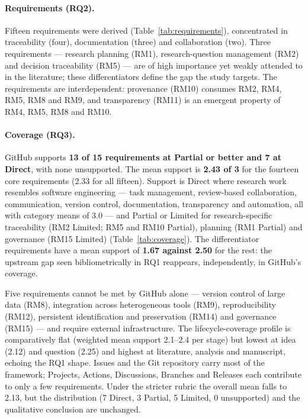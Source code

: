 \documentclass[pdflatex,sn-mathphys-num]{sn-jnl}%
\begin{document}
\paragraph{Requirements (RQ2).} Fifteen requirements were derived (Table~\ref{tab:requirements}), concentrated in traceability (four), documentation (three) and collaboration (two). Three requirements --- research planning (RM1), research-question management (RM2) and decision traceability (RM5) --- are of high importance yet weakly attended to in the literature; these differentiators define the gap the study targets. The requirements are interdependent: provenance (RM10) consumes RM2, RM4, RM5, RM8 and RM9, and transparency (RM11) is an emergent property of RM4, RM5, RM8 and RM10.

\paragraph{Coverage (RQ3).} GitHub supports \textbf{13 of 15 requirements at Partial or better and 7 at Direct}, with none unsupported. The mean support is \textbf{2.43 of 3} for the fourteen core requirements (2.33 for all fifteen). Support is Direct where research work resembles software engineering --- task management, review-based collaboration, communication, version control, documentation, transparency and automation, all with category means of 3.0 --- and Partial or Limited for research-specific traceability (RM2 Limited; RM5 and RM10 Partial), planning (RM1 Partial) and governance (RM15 Limited) (Table~\ref{tab:coverage}). The differentiator requirements have a mean support of \textbf{1.67 against 2.50} for the rest: the upstream gap seen bibliometrically in RQ1 reappears, independently, in GitHub's coverage.

Five requirements cannot be met by GitHub alone --- version control of large data (RM8), integration across heterogeneous tools (RM9), reproducibility (RM12), persistent identification and preservation (RM14) and governance (RM15) --- and require external infrastructure. The lifecycle-coverage profile is comparatively flat (weighted mean support 2.1--2.4 per stage) but lowest at idea (2.12) and question (2.25) and highest at literature, analysis and manuscript, echoing the RQ1 shape. Issues and the Git repository carry most of the framework; Projects, Actions, Discussions, Branches and Releases each contribute to only a few requirements. Under the stricter rubric the overall mean falls to 2.13, but the distribution (7 Direct, 3 Partial, 5 Limited, 0 unsupported) and the qualitative conclusion are unchanged.
\end{document}
